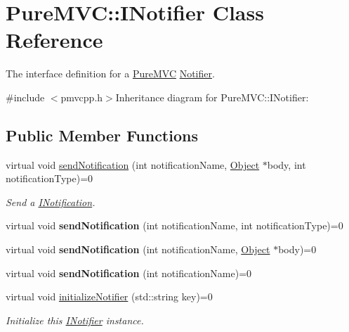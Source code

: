 \hypertarget{class_pure_m_v_c_1_1_i_notifier}{
\section{PureMVC::INotifier Class Reference}
\label{class_pure_m_v_c_1_1_i_notifier}
}


The interface definition for a \hyperlink{namespace_pure_m_v_c}{PureMVC} \hyperlink{class_pure_m_v_c_1_1_notifier}{Notifier}.  


{\ttfamily \#include $<$pmvcpp.h$>$}Inheritance diagram for PureMVC::INotifier:\subsection*{Public Member Functions}
\begin{DoxyCompactItemize}
\item 
virtual void \hyperlink{class_pure_m_v_c_1_1_i_notifier_a65e8333ccfea74138b79f84dac96af25}{sendNotification} (int notificationName, \hyperlink{class_pure_m_v_c_1_1_object}{Object} $\ast$body, int notificationType)=0
\begin{DoxyCompactList}\small\item\em Send a {\ttfamily \hyperlink{class_pure_m_v_c_1_1_i_notification}{INotification}}. \item\end{DoxyCompactList}\item 
\hypertarget{class_pure_m_v_c_1_1_i_notifier_ad9421945c1e0fd6d7ebbc136f9ecfba3}{
virtual void {\bfseries sendNotification} (int notificationName, int notificationType)=0}
\label{class_pure_m_v_c_1_1_i_notifier_ad9421945c1e0fd6d7ebbc136f9ecfba3}

\item 
\hypertarget{class_pure_m_v_c_1_1_i_notifier_a4d6bac0719be96948e4f7417489daeaa}{
virtual void {\bfseries sendNotification} (int notificationName, \hyperlink{class_pure_m_v_c_1_1_object}{Object} $\ast$body)=0}
\label{class_pure_m_v_c_1_1_i_notifier_a4d6bac0719be96948e4f7417489daeaa}

\item 
\hypertarget{class_pure_m_v_c_1_1_i_notifier_aca921608a2ced017a8face049fc7c6af}{
virtual void {\bfseries sendNotification} (int notificationName)=0}
\label{class_pure_m_v_c_1_1_i_notifier_aca921608a2ced017a8face049fc7c6af}

\item 
virtual void \hyperlink{class_pure_m_v_c_1_1_i_notifier_a28d7dbbe0726d4d52080546c5d79b232}{initializeNotifier} (std::string key)=0
\begin{DoxyCompactList}\small\item\em Initialize this \hyperlink{class_pure_m_v_c_1_1_i_notifier}{INotifier} instance. \item\end{DoxyCompactList}\end{DoxyCompactItemize}


